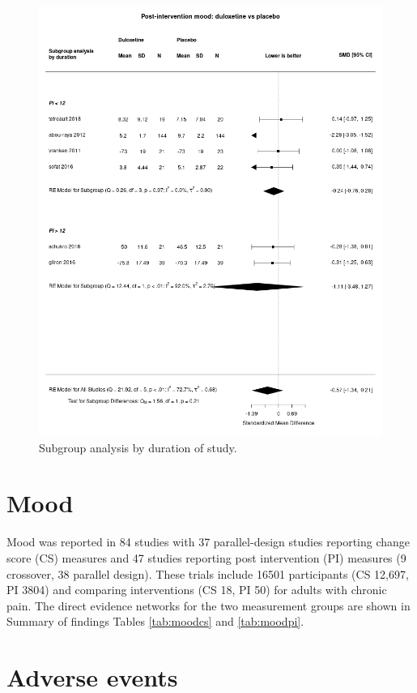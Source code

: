 \documentclass{report}\usepackage[]{graphicx}\usepackage[]{color}
\begin{document}
\begin{figure}
\includegraphics[width=\textwidth]{img/mood-post_int-duration-duloxetine-placebo-forest.png}
\caption[Mood by duration, duloxetine]{Subgroup analysis by duration of study.}
\label{fig:moodpi-duration-dulox-plac}
\end{figure}

\section{Mood}

Mood was reported in 84 studies with 37 parallel-design studies reporting change score (CS) measures and 47 studies reporting post intervention (PI) measures (9 crossover, 38 parallel design). These trials include 16501 participants (CS 12,697, PI 3804) and comparing interventions (CS 18, PI 50) for adults with chronic pain. The direct evidence networks for the two measurement groups are shown in Summary of findings Tables \ref{tab:moodcs} and \ref{tab:moodpi}.

\section{Adverse events}
\end{document}
